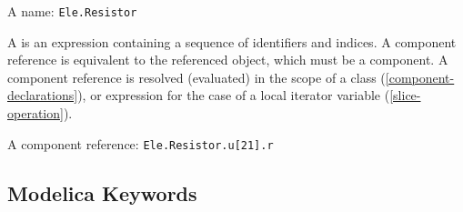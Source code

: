 \begin{example}
A name: \lstinline!Ele.Resistor!
\end{example}

A  is an expression containing a sequence of identifiers and indices.
A component reference is equivalent to the referenced object, which must be a component.
A component reference is resolved (evaluated) in the scope of a class (\cref{component-declarations}), or expression for the case of a local iterator variable (\cref{slice-operation}).

\begin{example}
A component reference: \lstinline!Ele.Resistor.u[21].r!
\end{example}


\subsection{Modelica Keywords}\label{modelica-keywords}

